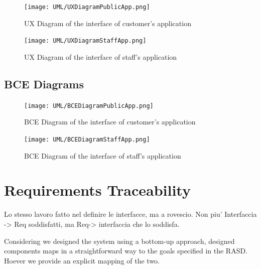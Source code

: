 \documentclass[11pt]{article} %
\begin{document}
\begin{figure}[H]
	\centering
	\texttt{[image: UML/UXDiagramPublicApp.png]}
	\caption{UX Diagram of the interface of customer's application}
\end{figure}

\begin{figure}[H]
	\centering
	\texttt{[image: UML/UXDiagramStaffApp.png]}
	\caption{UX Diagram of the interface of staff's application}
\end{figure}	

\subsection{BCE Diagrams}

\begin{figure}[H]
	\centering
	\texttt{[image: UML/BCEDiagramPublicApp.png]}
	\caption{BCE Diagram of the interface of customer's application}
\end{figure}	

\begin{figure}[H]
	\centering
	\texttt{[image: UML/BCEDiagramStaffApp.png]}
	\caption{BCE Diagram of the interface of staff's application}
\end{figure}	
	

\newpage
\section{Requirements Traceability}

{\color{red} {Lo stesso lavoro fatto nel definire le interfacce, ma a rovescio. Non piu' Interfaccia -> Req soddisfatti, ma Req-> interfaccia che lo soddisfa.}}

Considering we designed the system using a bottom-up approach, designed components maps in a straightforward way to the goals specified in the RASD. Hoever we provide an explicit mapping of the two.
\end{document}
